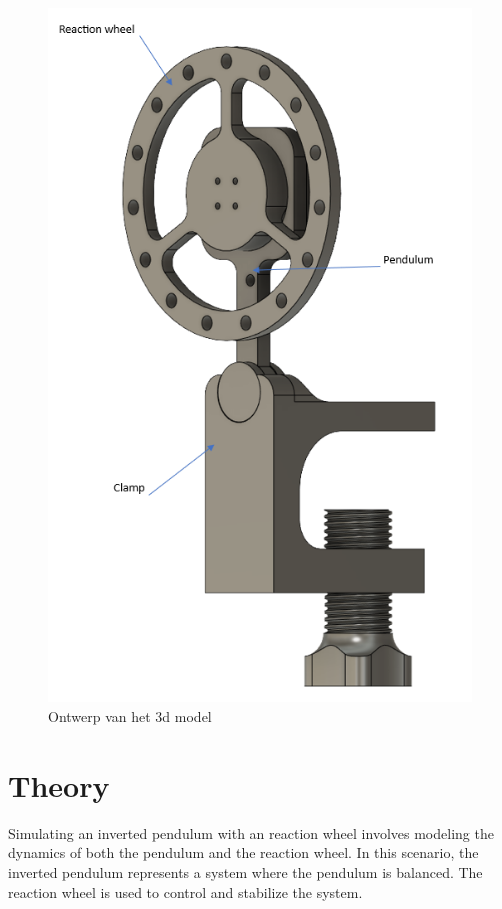\documentclass{article}
\begin{document}
\begin{multicols}{2}
\begin{figure}[H]
\centering
\includegraphics[scale=0.42]{Pendulum v13 schuin}
\caption{Ontwerp van het 3d model}
\label{fig:3d ontwerp}
\end{figure}

\section{Theory}

Simulating an inverted pendulum with an reaction wheel involves modeling the dynamics of both the pendulum and the reaction wheel. In this scenario, the inverted pendulum represents a system where the pendulum is balanced. The reaction wheel is used to control and stabilize the system.


\end{multicols}
\end{document}
